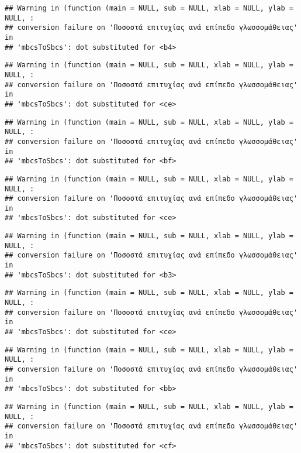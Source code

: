 \documentclass[
]{article}
\begin{document}
\begin{verbatim}
## Warning in (function (main = NULL, sub = NULL, xlab = NULL, ylab = NULL, :
## conversion failure on 'Ποσοστά επιτυχίας ανά επίπεδο γλωσσομάθειας' in
## 'mbcsToSbcs': dot substituted for <b4>
\end{verbatim}

\begin{verbatim}
## Warning in (function (main = NULL, sub = NULL, xlab = NULL, ylab = NULL, :
## conversion failure on 'Ποσοστά επιτυχίας ανά επίπεδο γλωσσομάθειας' in
## 'mbcsToSbcs': dot substituted for <ce>
\end{verbatim}

\begin{verbatim}
## Warning in (function (main = NULL, sub = NULL, xlab = NULL, ylab = NULL, :
## conversion failure on 'Ποσοστά επιτυχίας ανά επίπεδο γλωσσομάθειας' in
## 'mbcsToSbcs': dot substituted for <bf>
\end{verbatim}

\begin{verbatim}
## Warning in (function (main = NULL, sub = NULL, xlab = NULL, ylab = NULL, :
## conversion failure on 'Ποσοστά επιτυχίας ανά επίπεδο γλωσσομάθειας' in
## 'mbcsToSbcs': dot substituted for <ce>
\end{verbatim}

\begin{verbatim}
## Warning in (function (main = NULL, sub = NULL, xlab = NULL, ylab = NULL, :
## conversion failure on 'Ποσοστά επιτυχίας ανά επίπεδο γλωσσομάθειας' in
## 'mbcsToSbcs': dot substituted for <b3>
\end{verbatim}

\begin{verbatim}
## Warning in (function (main = NULL, sub = NULL, xlab = NULL, ylab = NULL, :
## conversion failure on 'Ποσοστά επιτυχίας ανά επίπεδο γλωσσομάθειας' in
## 'mbcsToSbcs': dot substituted for <ce>
\end{verbatim}

\begin{verbatim}
## Warning in (function (main = NULL, sub = NULL, xlab = NULL, ylab = NULL, :
## conversion failure on 'Ποσοστά επιτυχίας ανά επίπεδο γλωσσομάθειας' in
## 'mbcsToSbcs': dot substituted for <bb>
\end{verbatim}

\begin{verbatim}
## Warning in (function (main = NULL, sub = NULL, xlab = NULL, ylab = NULL, :
## conversion failure on 'Ποσοστά επιτυχίας ανά επίπεδο γλωσσομάθειας' in
## 'mbcsToSbcs': dot substituted for <cf>
\end{verbatim}
\end{document}
